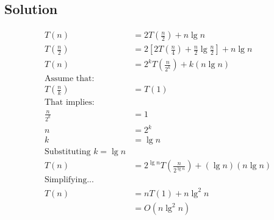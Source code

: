 \subsection*{Solution}
\begin{align*}
    T(n) &= 2T\left( \frac n2 \right) + n \lg n \\
    T(\frac{n}{2}) &= 2[2T\left( \frac{n}{4} \right) + \frac{n}{2} \lg \frac{n}{2}] + n \lg n \\
    T(n) &= 2^{k}T\left( \frac{n}{2^{k}} \right) + k \left(n \lg n\right) \\
    \text{Assume that:} \\
    T\left(\frac{n}{k}\right) &= T\left(1\right) \\
    \text{That implies:} \\
    \frac{n}{2^{k}} &= 1 \\
    n &= 2^{k} \\
    k &= \lg n \\
    \text{Substituting } k = \lg n \\
    T(n) &= 2^{\lg n}T\left( \frac{n}{2^{\lg n}} \right) + \left(\lg n\right) \left(n \lg n\right) \\
    \text{Simplifying...} \\
    T(n) &= nT\left(1\right) + n \lg^{2} n \\
         &= O(n \lg^{2} n)
\end{align*}
